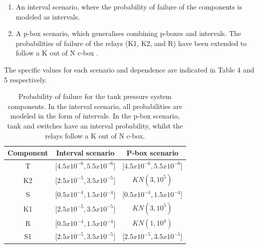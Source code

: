 \documentclass[runningheads]{llncs}
\begin{document}
\begin{enumerate}
    \item An interval scenario, where the probability of failure of the components is modeled as intervals.
    \item A p-box scenario, which generalises \cite{ferson2015dependence} combining p-boxes and intervals. The probabilities of failure of the relays (K1, K2, and R) have been extended to follow a K out of N c-box \cite{ferson2014computing}. 
\end{enumerate}

\noindent The specific values for each scenario and dependence are indicated in Table 4 and 5 respectively.

\begin{table}[]
\centering
\caption{Probability of failure for the tank pressure system components. In the interval scenario, all probabilities are modeled in the form of intervals. In the p-box scenario, tank and switches have an interval probability, whilst the relays follow a K out of N c-box.}\label{tab1}
\begin{tabular}{|c|c|c|}
\hline
Component & Interval scenario            & P-box scenario                           \\ \hline
T         & ${[}4.5x10^{-6}, 5.5x10^{-6}{]}$ & ${[}4.5x10^{-6}, 5.5x10^{-6}{]}$              \\ \hline
K2        & ${[}2.5x10^{-5}, 3.5x10^{-5}{]}$ & $KN(3,10^5)$ \\ \hline
S         & ${[}0.5x10^{-4}, 1.5x10^{-4}{]}$ & ${[}0.5x10^{-4}, 1.5x10^{-4}{]}$              \\ \hline
K1        & ${[}2.5x10^{-5}, 3.5x10^{-5}{]}$ & $KN(3,10^5)$ \\ \hline
R         & ${[}0.5x10^{-4}, 1.5x10^{-4}{]}$ & $KN(1,10^4)$ \\ \hline
S1        & ${[}2.5x10^{-5}, 3.5x10^{-5}{]}$ & ${[}2.5x10^{-5}, 3.5x10^{-5}{]}$              \\ \hline
\end{tabular}
\end{table}
\end{document}
